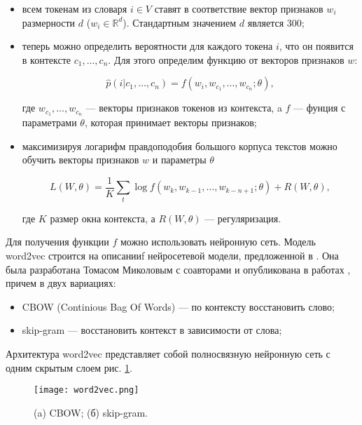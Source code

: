 \bigskip
\begin{itemize}
 \item всем токенам из словаря $i \in V$ ставят в соответствие вектор признаков $w_i$ размерности $d$ ($w_i
\in \mathds{R}^d$). Стандартным значением $d$ является 300;

 \item теперь можно определить вероятности для каждого токена $i$, что он появится в контексте $c_1, \ldots,
c_n$. Для этого определим функцию от векторов признаков $w$:

 \begin{equation}
  \hat{p}(i|c_1, \ldots, c_n) = f(w_i, w_{c_1}, \ldots, w_{c_n}; \theta),
 \end{equation}

 где $w_{c_1}, \ldots, w_{c_n}$ --- векторы признаков токенов из контекста, a $f$ --- фунция с параметрами
$\theta$, которая принимает векторы признаков;

 \item максимизируя логарифм правдоподобия большого корпуса текстов можно обучить векторы признаков $w$ и
параметры $\theta$

 \begin{equation}
  L(W, \theta) = \frac{1}{K}\sum_t \log{f(w_k, w_{k-1}, \ldots, w_{k-n+1}; \theta) + R(W, \theta)},
 \end{equation}

 где $K$ размер окна контекста, а $R(W, \theta)$ --- регуляризация.

\end{itemize}

\bigskip
Для получения функции $f$ можно использовать нейронную сеть. Модель word2vec строится на описанииf
нейросетевой модели, предложенной в \cite{Bengio}. Она была разработана Томасом Миколовым с соавторами и
опубликована в работах \cite{Mikolov:1, Mikolov:2}, причем в двух вариациях:

\bigskip
\begin{itemize}
 \item CBOW (Continious Bag Of Words) --- по контексту восстановить слово;
 \item skip-gram --- восстановить контекст в зависимости от слова;
\end{itemize}

\bigskip
Архитектура word2vec представляет собой полносвязную нейронную сеть с одним скрытым слоем рис.
\ref{fig:word2vec}.

\begin{figure}[ht]
    \centering
    \texttt{[image: word2vec.png]}
    \caption{(a) CBOW; (б) skip-gram.}
    \label{fig:word2vec}
\end{figure}

